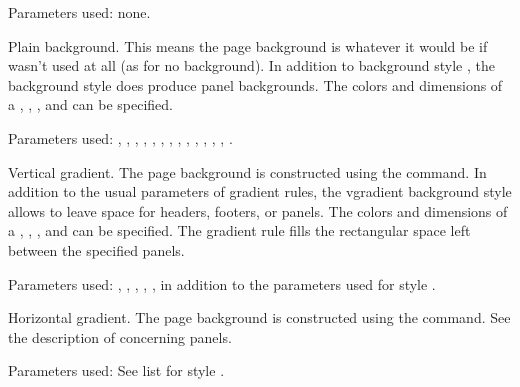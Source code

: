 \begin{slide}
\begin{description}
    Parameters used: none.

  \item[\present{Style: \code{plain}}]
    Plain background. This means the page background is whatever it would be if
     wasn't used at all (as for no background). In
    addition to background style , the background style 
    does produce panel backgrounds. The colors and dimensions of a , , , and  can
    be specified.

    \begin{flushleft}
    Parameters used: , , ,
    , , ,
    , , ,
    , , ,
    , .
    \end{flushleft}

  \item[\present{Style: \code{vgradient}}]
    Vertical gradient. The page background is constructed using the
     command. In addition to the
    usual parameters of gradient rules, the vgradient background style allows
    to leave space for headers, footers, or panels. The colors and dimensions
    of a , , , and
     can be specified. The gradient rule fills the
    rectangular space left between the specified panels.

    \begin{flushleft}
    Parameters used: , ,
    , , , 
    in addition to the parameters used for style .
    \end{flushleft}

  \item[\present{Style: \code{hgradient}}]
    Horizontal gradient. The page background is constructed using the
     command.  See the description of
     concerning panels.

    Parameters used: See list for style .


\end{description}
\end{slide}
